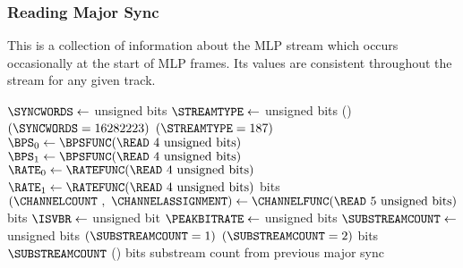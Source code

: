 \clearpage

\subsubsection{Reading Major Sync}
\label{mlp:readmajorsync}
This is a collection of information about the MLP stream
which occurs occasionally at the start of MLP frames.
Its values are consistent throughout the stream for any given track.
\par
\noindent
{
$\SYNCWORDS \leftarrow$  unsigned bits\;
$\STREAMTYPE \leftarrow$  unsigned bits\;
\eIf(){$(\SYNCWORDS = 16282223)$ \AND $(\STREAMTYPE = 187)$}{
  $\text{\BPS}_0 \leftarrow \BPSFUNC(\text{\READ 4 unsigned bits})$\;
  $\text{\BPS}_1 \leftarrow \BPSFUNC(\text{\READ 4 unsigned bits})$\;
  $\text{\RATE}_0 \leftarrow \RATEFUNC(\text{\READ 4 unsigned bits})$\;
  $\text{\RATE}_1 \leftarrow \RATEFUNC(\text{\READ 4 unsigned bits})$\;
   bits\;
  $(\text{\CHANNELCOUNT}~,~\text{\CHANNELASSIGNMENT}) \leftarrow \CHANNELFUNC(\text{\READ 5 unsigned bits})$\;
   bits\;
  $\text{\ISVBR} \leftarrow$  unsigned bit\;
  $\text{\PEAKBITRATE} \leftarrow$  unsigned bits\;
  $\text{\SUBSTREAMCOUNT} \leftarrow$  unsigned bits\;
  \ASSERT $(\text{\SUBSTREAMCOUNT} = 1)$ \OR $(\text{\SUBSTREAMCOUNT} = 2)$\;
   bits\;
  \Return $\text{\SUBSTREAMCOUNT}$\;
}(){
   bits\;
  \Return substream count from previous major sync\;
}
\EALGORITHM
}

